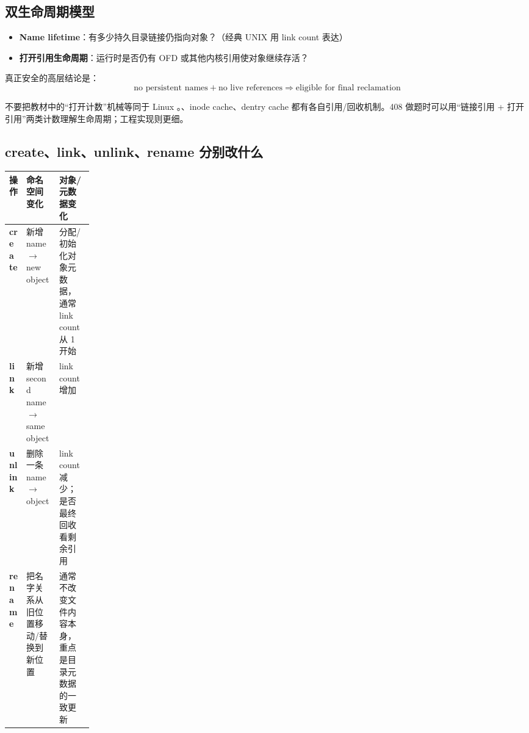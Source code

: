 \documentclass[11pt,a4paper]{ctexart}
\newcommand{\kw}[1]{\textbf{#1}}
\newcommand{\code}[1]{\texttt{\detokenize{#1}}}
\begin{document}
\begin{center}
\end{center}

\subsection{双生命周期模型}
\begin{itemize}
  \item \kw{Name lifetime}：有多少持久目录链接仍指向对象？（经典 UNIX 用 link count 表达）
  \item \kw{打开引用生命周期}：运行时是否仍有 OFD 或其他内核引用使对象继续存活？
\end{itemize}
真正安全的高层结论是：
\[
\boxed{\text{no persistent names} + \text{no live references} \Rightarrow \text{eligible for final reclamation}}
\]

\begin{eng}
不要把教材中的“打开计数”机械等同于 Linux \code{inode.i_count}。\code{struct file}、inode cache、dentry cache 都有各自引用/回收机制。408 做题时可以用“链接引用 + 打开引用”两类计数理解生命周期；工程实现则更细。
\end{eng}

\subsection{create、link、unlink、rename 分别改什么}
\begin{center}
\small
\begin{tabularx}{\linewidth}{>{\bfseries}p{0.16\linewidth} X X}
\toprule
操作 & 命名空间变化 & 对象/元数据变化 \\
\midrule
create & 新增 name $\to$ new object & 分配/初始化对象元数据，通常 link count 从 1 开始 \\
link & 新增 second name $\to$ same object & link count 增加 \\
unlink & 删除一条 name $\to$ object & link count 减少；是否最终回收看剩余引用 \\
rename & 把名字关系从旧位置移动/替换到新位置 & 通常不改变文件内容本身，重点是目录元数据的一致更新 \\
\bottomrule
\end{tabularx}
\end{center}
\end{document}
